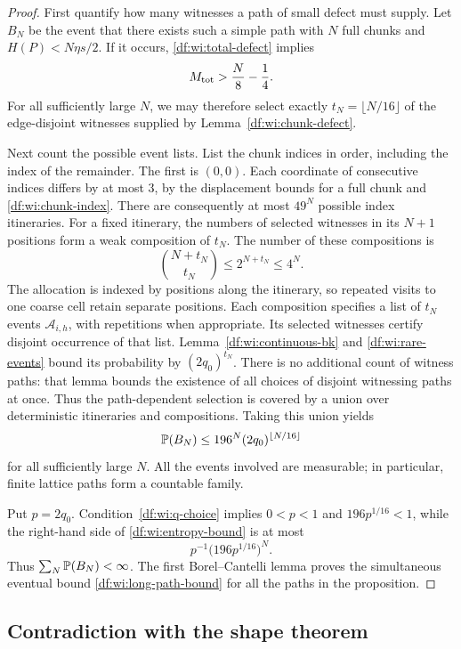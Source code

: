 \begin{proof}
First quantify how many witnesses a path of small defect must supply.
Let $B_N$ be the event that there exists such a simple path with $N$ full
chunks and $H(P)<N\eta s/2$.  If it occurs, \eqref{df:wi:total-defect}
implies
\[
  M_{\rm tot}>\frac N8-\frac14.
\]
For all sufficiently large $N$, we may therefore select exactly
$t_N=\lfloor N/16\rfloor$ of the edge-disjoint witnesses supplied by
Lemma~\ref{df:wi:chunk-defect}.

Next count the possible event lists. List the chunk indices in order,
including the index of the remainder.
The first is $(0,0)$.  Each coordinate of consecutive indices differs
by at most $3$, by the displacement bounds for a full chunk and
\eqref{df:wi:chunk-index}.  There are consequently at most $49^N$ possible
index itineraries.  For a fixed itinerary, the numbers of selected
witnesses in its $N+1$ positions form a weak composition of $t_N$.
The number of these compositions is
\[
  \binom{N+t_N}{t_N}\le2^{N+t_N}\le4^N.
\]
The allocation is indexed by positions along the itinerary, so repeated
visits to one coarse cell retain separate positions. Each composition
specifies a list of $t_N$ events
$\mathcal A_{i,h}$, with repetitions when appropriate.  Its selected
witnesses certify disjoint occurrence of that list.  Lemma~\ref{df:wi:continuous-bk}
and \eqref{df:wi:rare-events} bound its probability by $(2q_0)^{t_N}$.
There is no additional count of witness paths: that lemma bounds the
existence of all choices of disjoint witnessing paths at once.
Thus the path-dependent selection is covered by a union over deterministic
itineraries and compositions. Taking this union yields
\begin{equation}
\label{df:wi:entropy-bound}
  \mathbb P(B_N)\le196^N(2q_0)^{\lfloor N/16\rfloor}
\end{equation}
for all sufficiently large $N$.  All the events involved are measurable;
in particular, finite lattice paths form a countable family.

Put $p=2q_0$.  Condition~\eqref{df:wi:q-choice} implies $0<p<1$ and
$196p^{1/16}<1$, while the right-hand side of
\eqref{df:wi:entropy-bound} is at most
\[
  p^{-1}\bigl(196p^{1/16}\bigr)^N.
\]
Thus $\sum_N\mathbb P(B_N)<\infty$.  The first Borel--Cantelli lemma proves
the simultaneous eventual bound \eqref{df:wi:long-path-bound} for all the
paths in the proposition.
\end{proof}

\subsection{Contradiction with the shape theorem}

